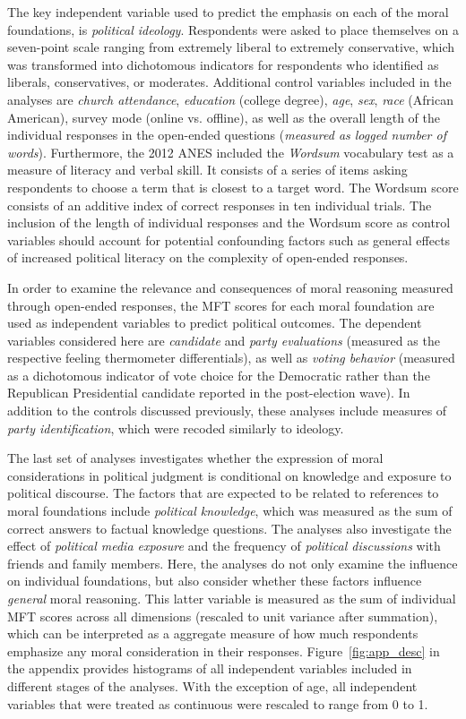 \documentclass[12pt]{article}
\begin{document}
The key independent variable used to predict the emphasis on each of the moral foundations, is \textit{political ideology}. Respondents were asked to place themselves on a seven-point scale ranging from extremely liberal to extremely conservative, which was transformed into dichotomous indicators for respondents who identified as liberals, conservatives, or moderates. Additional control variables included in the analyses are \textit{church attendance}, \textit{education} (college degree), \textit{age}, \textit{sex}, \textit{race} (African American), survey mode (online vs. offline), as well as the overall length of the individual responses in the open-ended questions (\textit{measured as logged number of words}). Furthermore, the 2012 ANES included the \textit{Wordsum} vocabulary test as a measure of literacy and verbal skill. It consists of a series of items asking respondents to choose a term that is closest to a target word. The Wordsum score consists of an additive index of correct responses in ten individual trials. The inclusion of the length of individual responses and the Wordsum score as control variables should account for potential confounding factors such as general effects of increased political literacy on the complexity of open-ended responses.

In order to examine the relevance and consequences of moral reasoning measured through open-ended responses, the MFT scores for each moral foundation are used as independent variables to predict political outcomes. The dependent variables considered here are \textit{candidate} and \textit{party evaluations} (measured as the respective feeling thermometer differentials), as well as \textit{voting behavior} (measured as a dichotomous indicator of vote choice for the Democratic rather than the Republican Presidential candidate reported in the post-election wave). In addition to the controls discussed previously, these analyses include measures of \textit{party identification}, which were recoded similarly to ideology.

The last set of analyses investigates whether the expression of moral considerations in political judgment is conditional on knowledge and exposure to political discourse. The factors that are expected to be related to references to moral foundations include \textit{political knowledge}, which was measured as the sum of correct answers to factual knowledge questions. The analyses also investigate the effect of \textit{political media exposure} and the frequency of \textit{political discussions} with friends and family members. Here, the analyses do not only examine the influence on individual foundations, but also consider whether these factors influence \textit{general} moral reasoning. This latter variable is measured as the sum of individual MFT scores across all dimensions (rescaled to unit variance after summation), which can be interpreted as a aggregate measure of how much respondents emphasize any moral consideration in their responses. Figure~\ref{fig:app_desc} in the appendix provides histograms of all independent variables included in different stages of the analyses. With the exception of age, all independent variables that were treated as continuous were rescaled to range from 0 to 1.
\end{document}
